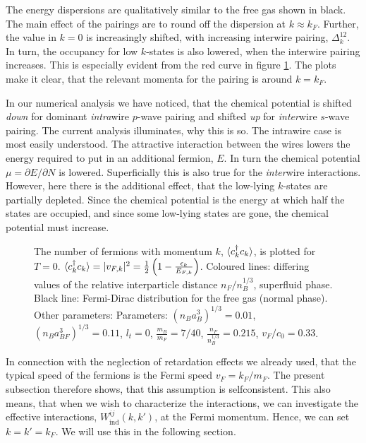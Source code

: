 The energy dispersions are qualitatively similar to the free gas shown in black. The main effect of the pairings are to round off the dispersion at $k \approx k_F$. Further, the value in $k = 0$ is increasingly shifted, with increasing interwire pairing, $\Delta^{12}_k$. In turn, the occupancy for low $k$-states is also lowered, when the interwire pairing increases. This is especially evident from the red curve in figure \ref{fig.Occupancy}. The plots make it clear, that the relevant momenta for the pairing is around $k = k_F$. 

In our numerical analysis we have noticed, that the chemical potential is shifted \textit{down} for dominant \textit{intra}wire $p$-wave pairing and shifted \textit{up} for \textit{inter}wire $s$-wave pairing. The current analysis illuminates, why this is so. The intrawire case is most easily understood. The attractive interaction between the wires lowers the energy required to put in an additional fermion, $E$. In turn the chemical potential $\mu = \partial E / \partial N$ is lowered. Superficially this is also true for the \textit{inter}wire interactions. However, here there is the additional effect, that the low-lying $k$-states are partially depleted. Since the chemical potential is the energy at which half the states are occupied, and since some low-lying states are gone, the chemical potential must increase. 

\begin{figure} 
\begin{center}  
  
\caption{The number of fermions with momentum $k$, $\braket{c_k^\dagger c_k}$, is plotted for $T = 0$. $\braket{c_k^\dagger c_k} = |v_{F,k}|^2 = \frac{1}{2}\left(1 - \frac{\epsilon_k}{E_{F,k}}\right)$. Coloured lines: differing values of the relative interparticle distance $n_F / n_B^{1/3}$, superfluid phase. Black line: Fermi-Dirac distribution for the free gas (normal phase). Other parameters: Parameters: $(n_Ba_B^3)^{1/3} = 0.01$, $(n_Ba_{BF}^3)^{1/3} = 0.11$, $l_t = 0$, $\frac{m_B}{m_F} = 7/40$, $\frac{n_F}{n_B^{1/3}} = 0.215$, $v_F/c_0 = 0.33$. }  
\label{fig.Occupancy}  
\end{center}    
\end{figure}

In connection with the neglection of retardation effects we already used, that the typical speed of the fermions is the Fermi speed $v_F = k_F/m_F$. The present subsection therefore shows, that this assumption is selfconsistent. This also means, that when we wish to characterize the interactions, we can investigate the effective interactions, $W^{ij}_{\text{ind}}(k, k')$, at the Fermi momentum. Hence, we can set $k = k' = k_F$. We will use this in the following section.


